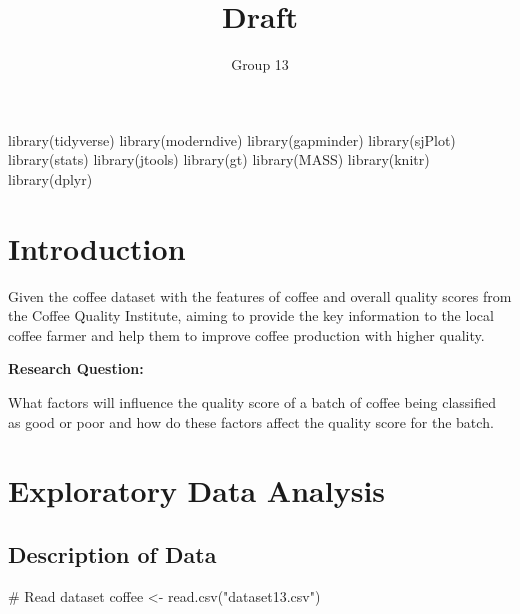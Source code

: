 \documentclass[
  letterpaper,
  DIV=11,
  numbers=noendperiod]{scrartcl}
\title{Draft}
\author{Group 13}
\date{}
\newenvironment{Shaded}{\begin{snugshade}}{\end{snugshade}}
\newcommand{\CommentTok}[1]{\textcolor[rgb]{0.37,0.37,0.37}{#1}}
\newcommand{\FunctionTok}[1]{\textcolor[rgb]{0.28,0.35,0.67}{#1}}
\newcommand{\NormalTok}[1]{\textcolor[rgb]{0.00,0.23,0.31}{#1}}
\newcommand{\OtherTok}[1]{\textcolor[rgb]{0.00,0.23,0.31}{#1}}
\newcommand{\StringTok}[1]{\textcolor[rgb]{0.13,0.47,0.30}{#1}}
\begin{document}
\maketitle


\begin{Shaded}
\begin{Highlighting}[]
\FunctionTok{library}\NormalTok{(tidyverse)}
\FunctionTok{library}\NormalTok{(moderndive)}
\FunctionTok{library}\NormalTok{(gapminder)}
\FunctionTok{library}\NormalTok{(sjPlot)}
\FunctionTok{library}\NormalTok{(stats)}
\FunctionTok{library}\NormalTok{(jtools)}
\FunctionTok{library}\NormalTok{(gt)}
\FunctionTok{library}\NormalTok{(MASS)}
\FunctionTok{library}\NormalTok{(knitr)}
\FunctionTok{library}\NormalTok{(dplyr)}
\end{Highlighting}
\end{Shaded}

\section{Introduction}\label{introduction}

Given the coffee dataset with the features of coffee and overall quality
scores from the Coffee Quality Institute, aiming to provide the key
information to the local coffee farmer and help them to improve coffee
production with higher quality.

\textbf{Research Question:}

What factors will influence the quality score of a batch of coffee being
classified as good or poor and how do these factors affect the quality
score for the batch.

\section{Exploratory Data Analysis}\label{exploratory-data-analysis}

\subsection{Description of Data}\label{description-of-data}

\begin{Shaded}
\begin{Highlighting}[]
\CommentTok{\# Read dataset}
\NormalTok{coffee }\OtherTok{\textless{}{-}} \FunctionTok{read.csv}\NormalTok{(}\StringTok{"dataset13.csv"}\NormalTok{)}
\end{Highlighting}
\end{Shaded}
\end{document}
